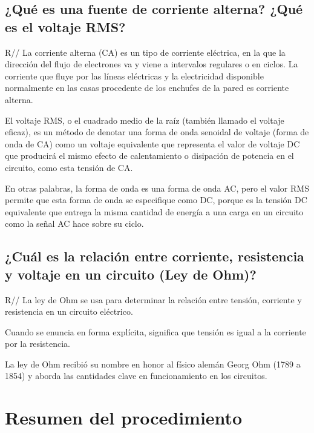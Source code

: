 \documentclass[letterpaper, 12pt]{report}
\begin{document}
\subsection{¿Qué es una fuente de corriente alterna? ¿Qué es el voltaje RMS?}

R// La corriente alterna (CA) es un tipo de corriente eléctrica, en
la que la dirección del flujo de electrones va y viene a intervalos
regulares o en ciclos. La corriente que fluye por las líneas eléctricas
y la electricidad disponible normalmente en las casas procedente de los
enchufes de la pared es corriente alterna.~\cite{CorrienteAlterna}

\vspace{.5cm}

El voltaje RMS, o el cuadrado medio de la raíz
(también llamado el voltaje eficaz), es un método de denotar una forma de
onda senoidal de voltaje (forma de onda de CA) como un voltaje equivalente
que representa el valor de voltaje DC que producirá el mismo efecto de
calentamiento o disipación de potencia en el circuito,
como esta tensión de CA.\@~\cite{VoltajeRMS}

\vspace{.5cm}

En otras palabras, la forma de onda es una forma de onda AC, pero el
valor RMS permite que esta forma de onda se especifique como DC, porque
es la tensión DC equivalente que entrega la misma cantidad de energía a
una carga en un circuito como la señal AC hace sobre
su ciclo.~\cite{VoltajeRMS}

\subsection{¿Cuál es la relación entre corriente, resistencia
	y voltaje en un circuito (Ley de Ohm)?}

R// La ley de Ohm se usa para determinar la relación entre tensión,
corriente y resistencia en un circuito eléctrico.~\cite{LeyDeOhm}

\vspace{.5cm}

Cuando se enuncia en forma explícita, significa que tensión es igual a la
corriente por la resistencia.~\cite{LeyDeOhm}

\vspace{.7cm}

La ley de Ohm recibió su nombre en honor al físico alemán Georg Ohm
(1789 a 1854) y aborda las cantidades clave en funcionamiento en 
los circuitos.~\cite{LeyDeOhm}

\section{Resumen del procedimiento}

\newpage

\end{document}
